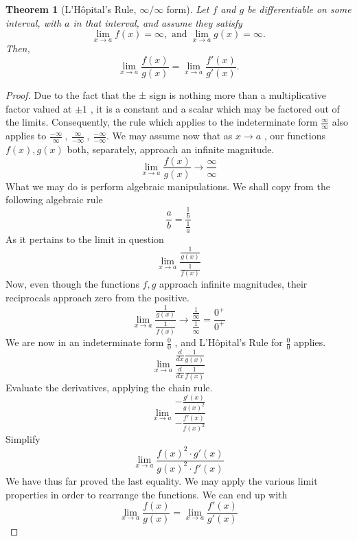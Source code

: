\documentclass[a4paper]{amsproc}
\theoremstyle{plain}
\newtheorem{thm}{Theorem}[section]
\numberwithin{equation}{section} %
\numberwithin{figure}{section} %
\theoremstyle{plain}
\theoremstyle{definition}
\theoremstyle{definition}
\theoremstyle{remark}
\begin{document}
\begin{thm}[L'H\^{o}pital's Rule, $\infty /\infty$ form]
Let \( f \) and \( g \) be differentiable on some interval, with \( a \) in that interval, and assume they satisfy
\[\lim _{x\rightarrow a}f(x)=\infty ,\, \, \mathrm{and}\, \, \lim _{x\rightarrow a}g(x)=\infty .\]
Then,
\[\lim _{x\rightarrow a}\frac{f(x)}{g(x)}=\lim _{x\rightarrow a}\frac{f'(x)}{g'(x)}.\]
\end{thm}
\begin{proof}
Due to the fact that the ± sign is nothing more than a multiplicative factor valued at $\pm1$ , it is a constant and a scalar which
may be factored out of the limits. Consequently, the rule which applies to the indeterminate form $\tfrac{\infty}{\infty}$ also applies
to $\tfrac{-\infty}{\infty}\ ,\ \tfrac{\infty}{-\infty}\ ,\ \tfrac{-\infty}{-\infty}$. We may assume now that as $x\to a$ , our
functions $f(x),g(x)$ both, separately, approach an infinite magnitude.
\[\lim_{x\to a}\frac{f(x)}{g(x)}\to\frac{\infty}{\infty}\]
What we may do is perform algebraic manipulations. We shall copy from the following algebraic rule
\[\frac{a}{b}=\frac{\frac1b}{\frac1a}\]
As it pertains to the limit in question
\[\lim_{x\to a}\frac{\frac1{g(x)}}{\frac1{f(x)}}\]
Now, even though the functions $f,g$ approach infinite magnitudes, their reciprocals approach zero from the positive.
\[\lim_{x\to a}\frac{\frac{1}{g(x)}}{\frac{1}{f(x)}}\to\frac{\frac{1}{\infty}}{\frac{1}{\infty}}=\frac{0^+}{0^+}\]
We are now in an indeterminate form $\tfrac00$ , and L'H\^{o}pital's Rule for $\tfrac00$ applies.
\[\lim_{x\to a}\frac{\frac{d}{dx}\frac1{g(x)}}{\frac{d}{dx}\frac{1}{f(x)}}\]
Evaluate the derivatives, applying the chain rule.
\[\lim_{x\to a}\frac{-\frac{g'(x)}{g(x)^2}}{-\frac{f'(x)}{f(x)^2}}\]
Simplify
\[\lim_{x\to a}\frac{f(x)^2\cdot g'(x)}{g(x)^2\cdot f'(x)}\]
We have thus far proved the last equality. We may apply the various limit properties in order to rearrange the functions. We can end
up with
\[\lim_{x\to a}\frac{f(x)}{g(x)}=\lim_{x\to a}\frac{f'(x)}{g'(x)}\]
\end{proof}
\end{document}
